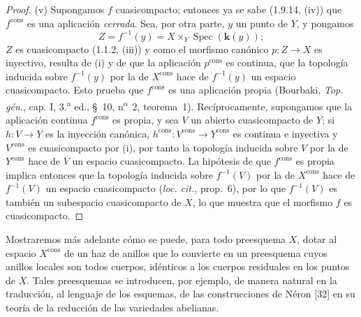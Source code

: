 \begin{proof}
(v) Supongamos $f$ cuasicompacto; entonces ya se sabe (1.9.14, (iv)) que
$f^{\mathrm{cons}}$ es una aplicación \emph{cerrada}. Sea, por otra parte, $y$ un
punto de $Y$, y pongamos
\[
  Z=f^{-1}(y)=X\times_Y\operatorname{Spec}(\boldsymbol{k}(y));
\]
$Z$ es cuasicompacto (1.1.2, (iii)) y como el morfismo canónico
$p:Z\to X$ es inyectivo, resulta de (i) y de que la aplicación
$p^{\mathrm{cons}}$ es continua, que la topología inducida sobre $f^{-1}(y)$
por la de $X^{\mathrm{cons}}$ hace de $f^{-1}(y)$ un espacio cuasicompacto.
Esto prueba que $f^{\mathrm{cons}}$ es una aplicación propia (Bourbaki,
\emph{Top. gén.}, cap. I, 3.\textsuperscript{a} ed.,
\S~10, n\textsuperscript{o}~2, teorema~1). Recíprocamente, supongamos que
la aplicación continua $f^{\mathrm{cons}}$ es propia, y sea $V$ un abierto
cuasicompacto de $Y$; si $h:V\to Y$ es la inyección canónica,
$h^{\mathrm{cons}}:V^{\mathrm{cons}}\to Y^{\mathrm{cons}}$ es continua e
inyectiva y $V^{\mathrm{cons}}$ es cuasicompacto por (i), por tanto la topología
inducida sobre $V$ por la de $Y^{\mathrm{cons}}$ hace de $V$ un espacio
cuasicompacto. La hipótesis de que $f^{\mathrm{cons}}$ es propia implica entonces
que la topología inducida sobre $f^{-1}(V)$ por la de $X^{\mathrm{cons}}$ hace
de $f^{-1}(V)$ un espacio cuasicompacto (\emph{loc. cit.}, prop.~6), por lo que
$f^{-1}(V)$ es también un subespacio cuasicompacto de $X$, lo que muestra que
el morfismo $f$ es cuasicompacto.
\end{proof}

\begin{env}[1.9.16]
\label{IV.1.9.16-fr}
Mostraremos más adelante cómo se puede, para todo preesquema $X$, dotar
al espacio $X^{\mathrm{cons}}$ de un haz de anillos que lo convierte en un preesquema
cuyos anillos locales son todos cuerpos, idénticos a los cuerpos residuales en los
puntos de $X$. Tales preesquemas se introducen, por ejemplo, de manera natural
en la traducción, al lenguaje de los esquemas, de las construcciones de
Néron [32] en su teoría de la reducción de las variedades abelianas.
\end{env}




